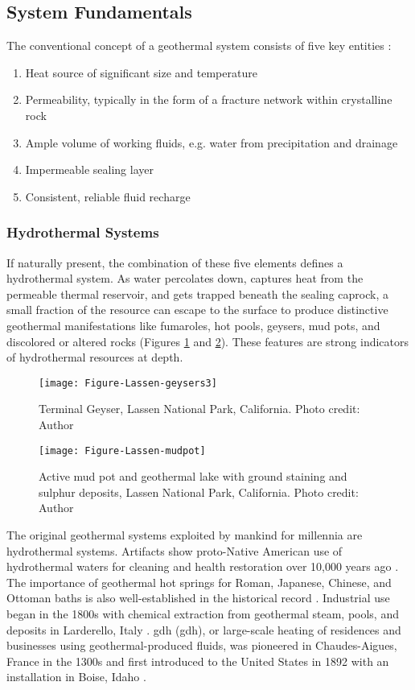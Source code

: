 \subsection{System Fundamentals}
The conventional concept of a geothermal system consists of five key entities \citep[~p. 9]{dipippo_geothermal_2012}:
\renewcommand{\labelenumi}{\roman{enumi}}
\begin{enumerate}
   \item Heat source of significant size and temperature
   \item Permeability, typically in the form of a fracture network within crystalline rock
   \item Ample volume of working fluids, e.g. water from precipitation and drainage
   \item Impermeable sealing layer
   \item Consistent, reliable fluid recharge
\end{enumerate}

\subsubsection{Hydrothermal Systems}
If naturally present, the combination of these five elements defines a hydrothermal system. As water percolates down, captures heat from the permeable thermal reservoir, and gets trapped beneath the sealing caprock, a small fraction of the resource can escape to the surface to produce distinctive geothermal manifestations like fumaroles, hot pools, geysers, mud pots, and discolored or altered rocks (Figures \ref{fig:lassen-geysers} and \ref{fig:lassen-mudpot}). These features are strong indicators of hydrothermal resources at depth.
\begin{figure}[h!]
\centering
\texttt{[image: Figure-Lassen-geysers3]}
\caption[Terminal Geyser, Lassen National Park]{Terminal Geyser, Lassen National Park, California. Photo credit: Author}
\label{fig:lassen-geysers}
\end{figure}
\begin{figure}[htbp]
\centering
\texttt{[image: Figure-Lassen-mudpot]}
\caption[Mud pot, Lassen National Park]{Active mud pot and geothermal lake with ground staining and sulphur deposits, Lassen National Park, California. Photo credit: Author}
\label{fig:lassen-mudpot}
\end{figure}
The original geothermal systems exploited by mankind for millennia are hydrothermal systems. Artifacts show proto-Native American use of hydrothermal waters for cleaning and health restoration over 10,000 years ago \citep{doe_history_2021}. The importance of geothermal hot springs for Roman, Japanese, Chinese, and Ottoman baths is also well-established in the historical record \citep{lund_characteristics_2007}. Industrial use began in the 1800s with chemical extraction from geothermal steam, pools, and deposits in Larderello, Italy \citep[~p. 251]{dipippo_geothermal_2012}. \acrlong{gdh} (\acrshort{gdh}), or large-scale heating of residences and businesses using geothermal-produced fluids, was pioneered in Chaudes-Aigues, France in the 1300s and first introduced to the United States in 1892 with an installation in Boise, Idaho \citep{lund_characteristics_2007}.

